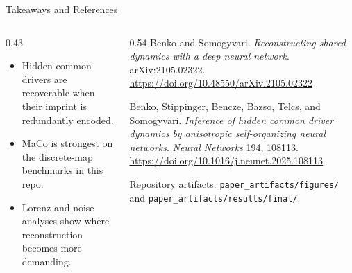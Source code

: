 \documentclass[aspectratio=169,11pt]{beamer}
\begin{document}
\begin{frame}{Takeaways and References}
  \begin{columns}[T,onlytextwidth]
    \begin{column}{0.43\textwidth}
      \begin{itemize}
        \item Hidden common drivers are recoverable when their imprint is redundantly encoded.
        \item MaCo is strongest on the discrete-map benchmarks in this repo.
        \item Lorenz and noise analyses show where reconstruction becomes more demanding.
      \end{itemize}
    \end{column}
    \begin{column}{0.54\textwidth}
      \scriptsize
      Benko and Somogyvari. \emph{Reconstructing shared dynamics with a deep neural network}. arXiv:2105.02322.\\
      \url{https://doi.org/10.48550/arXiv.2105.02322}

      \vspace{0.7em}
      Benko, Stippinger, Bencze, Bazso, Telcs, and Somogyvari.
      \emph{Inference of hidden common driver dynamics by anisotropic self-organizing neural networks}.
      \emph{Neural Networks} 194, 108113.\\
      \url{https://doi.org/10.1016/j.neunet.2025.108113}

      \vspace{0.7em}
      Repository artifacts: \texttt{paper\_artifacts/figures/} and
      \texttt{paper\_artifacts/results/final/}.
    \end{column}
  \end{columns}
\end{frame}
\end{document}
